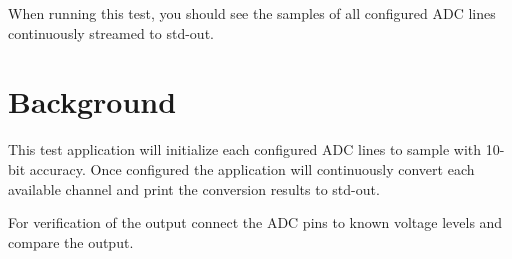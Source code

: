 When running this test, you should see the samples of all configured A\+DC lines continuously streamed to std-\/out.

\section*{Background }

This test application will initialize each configured A\+DC lines to sample with 10-\/bit accuracy. Once configured the application will continuously convert each available channel and print the conversion results to std-\/out.

For verification of the output connect the A\+DC pins to known voltage levels and compare the output. 